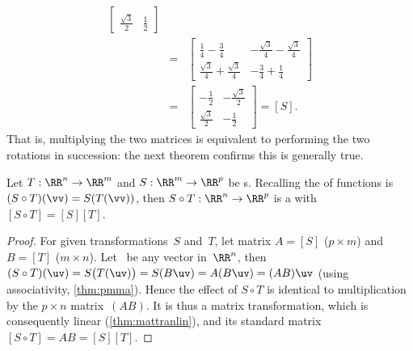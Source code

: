 \begin{example}
\begin{solution}
\begin{eqnarray*}
\begin{bmatrix}
\\\frac{\sqrt3}2&\frac12 \end{bmatrix}
\\&=&\begin{bmatrix} \tfrac14-\tfrac34 & -\tfrac{\sqrt3}4-\tfrac{\sqrt3}4
\\ \tfrac{\sqrt3}4+\tfrac{\sqrt3}4 & -\tfrac34+\tfrac14\end{bmatrix}
\\&=&\begin{bmatrix} -\frac12&-\frac{\sqrt3}2
\\\frac{\sqrt3}2&-\frac12 \end{bmatrix}=[S].
\end{eqnarray*}
That is, multiplying the two matrices is equivalent to performing the two rotations in succession: the next theorem confirms this is generally true.
\end{solution}
\end{example}





\begin{theorem} \label{thm:stmatcomp} 
Let \(T:\RR^n\to\RR^m\) and \(S:\RR^m\to\RR^p\) be s.  
Recalling the  of functions is \((S\circ T)(\vv)=S(T(\vv))\), then \(S\circ T:\RR^n\to\RR^p\) is a  with  \([S\circ T]=[S][T]\).
\end{theorem}
\begin{proof} 
For given transformations~\(S\) and~\(T\), let matrix \(A=[S]\) (\(p\times m\)) and \(B=[T]\) (\(m\times n\)).
Let \uv\ be any vector in~\(\RR^n\), then
\((S\circ T)(\uv)
=S\big(T(\uv)\big)
=S(B\uv)
=A(B\uv)
=(AB)\uv\) (using associativity, \autoref{thm:pmma}).
Hence the effect of \(S\circ T\) is identical to multiplication by the  \(p\times n\) matrix~\((AB)\).
It is thus a matrix transformation, which is consequently linear (\autoref{thm:mattranlin}), and its standard matrix \([S\circ T]=AB=[S][T]\).
\end{proof}


